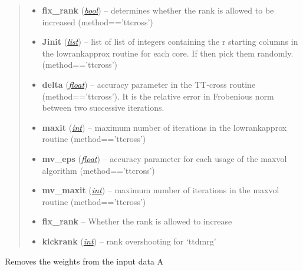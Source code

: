 \documentclass[a4paper,10pt,english]{sphinxmanual}
\begin{document}
\begin{fulllineitems}
\begin{fulllineitems}
\begin{quote}
\begin{description}
\begin{itemize}
\item {} 
\textbf{fix\_rank} (\href{http://docs.python.org/library/functions.html\#bool}{\emph{bool}}) -- determines whether the rank is allowed to be increased (method=='ttcross')

\item {} 
\textbf{Jinit} (\href{http://docs.python.org/library/functions.html\#list}{\emph{list}}) -- list of list of integers containing the r starting columns in the lowrankapprox routine for each core. If  then pick them randomly. (method=='ttcross')

\item {} 
\textbf{delta} (\href{http://docs.python.org/library/functions.html\#float}{\emph{float}}) -- accuracy parameter in the TT-cross routine (method=='ttcross'). It is the relative error in Frobenious norm between two successive iterations.

\item {} 
\textbf{maxit} (\href{http://docs.python.org/library/functions.html\#int}{\emph{int}}) -- maximum number of iterations in the lowrankapprox routine (method=='ttcross')

\item {} 
\textbf{mv\_eps} (\href{http://docs.python.org/library/functions.html\#float}{\emph{float}}) -- accuracy parameter for each usage of the maxvol algorithm (method=='ttcross')

\item {} 
\textbf{mv\_maxit} (\href{http://docs.python.org/library/functions.html\#int}{\emph{int}}) -- maximum number of iterations in the maxvol routine (method=='ttcross')

\item {} 
\textbf{fix\_rank} -- Whether the rank is allowed to increase

\item {} 
\textbf{kickrank} (\href{http://docs.python.org/library/functions.html\#int}{\emph{int}}) -- rank overshooting for `ttdmrg'

\end{itemize}

\end{description}\end{quote}

\end{fulllineitems}


\begin{fulllineitems}
\label{api-wttvec:TensorToolbox.core.WTTvec.remove_weights_from_data}
Removes the weights from the input data A

\end{fulllineitems}


\end{fulllineitems}
\end{document}
